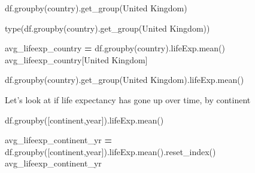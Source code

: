 \documentclass[
  letterpaper,
]{scrbook}
\newenvironment{Shaded}{\begin{snugshade}}{\end{snugshade}}
\newcommand{\BuiltInTok}[1]{#1}
\newcommand{\NormalTok}[1]{#1}
\newcommand{\OperatorTok}[1]{\textcolor[rgb]{0.81,0.36,0.00}{\textbf{#1}}}
\newcommand{\StringTok}[1]{\textcolor[rgb]{0.31,0.60,0.02}{#1}}
\begin{document}
\begin{Shaded}
\begin{Highlighting}[]
\NormalTok{df.groupby(}\StringTok{\textquotesingle{}country\textquotesingle{}}\NormalTok{).get\_group(}\StringTok{\textquotesingle{}United Kingdom\textquotesingle{}}\NormalTok{)}
\end{Highlighting}
\end{Shaded}

\begin{Shaded}
\begin{Highlighting}[]
\BuiltInTok{type}\NormalTok{(df.groupby(}\StringTok{\textquotesingle{}country\textquotesingle{}}\NormalTok{).get\_group(}\StringTok{\textquotesingle{}United Kingdom\textquotesingle{}}\NormalTok{))}
\end{Highlighting}
\end{Shaded}

\begin{Shaded}
\begin{Highlighting}[]
\NormalTok{avg\_lifeexp\_country }\OperatorTok{=}\NormalTok{ df.groupby(}\StringTok{\textquotesingle{}country\textquotesingle{}}\NormalTok{).lifeExp.mean()}
\NormalTok{avg\_lifeexp\_country[}\StringTok{\textquotesingle{}United Kingdom\textquotesingle{}}\NormalTok{]}
\end{Highlighting}
\end{Shaded}

\begin{Shaded}
\begin{Highlighting}[]
\NormalTok{df.groupby(}\StringTok{\textquotesingle{}country\textquotesingle{}}\NormalTok{).get\_group(}\StringTok{\textquotesingle{}United Kingdom\textquotesingle{}}\NormalTok{).lifeExp.mean()}
\end{Highlighting}
\end{Shaded}

Let's look at if life expectancy has gone up over time, by continent

\begin{Shaded}
\begin{Highlighting}[]
\NormalTok{df.groupby([}\StringTok{\textquotesingle{}continent\textquotesingle{}}\NormalTok{,}\StringTok{\textquotesingle{}year\textquotesingle{}}\NormalTok{]).lifeExp.mean()}
\end{Highlighting}
\end{Shaded}

\begin{Shaded}
\begin{Highlighting}[]
\NormalTok{avg\_lifeexp\_continent\_yr }\OperatorTok{=}\NormalTok{ df.groupby([}\StringTok{\textquotesingle{}continent\textquotesingle{}}\NormalTok{,}\StringTok{\textquotesingle{}year\textquotesingle{}}\NormalTok{]).lifeExp.mean().reset\_index()}
\NormalTok{avg\_lifeexp\_continent\_yr}
\end{Highlighting}
\end{Shaded}
\end{document}
